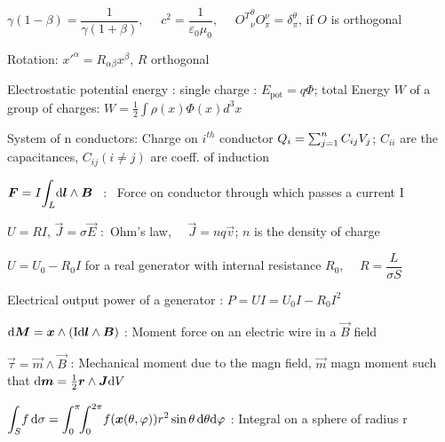 \squishend


\squishlist%
\item $\gamma(1-\beta) = \dfrac{1}{\gamma(1+\beta)}, \quad  \,\, c^2 = \dfrac{1}{\varepsilon_0\mu_0}, \quad \,\, {O^T}^{\theta}_{\nu} O^{\nu}_{\pi} = \delta^{\theta}_{\pi}$, if $O$ is orthogonal
\item Rotation: $x'^\alpha=R_{\alpha \beta}x^\beta$, $R$ orthogonal

\item Electrostatic potential energy : single charge : $E_{\text{pot}} = q\Phi$; total Energy $W$ of a group of charges: $W=\frac{1}{2}\int\rho(x)\Phi(x)d^3x$

\item System of n conductors: Charge on $i^{th}$ conductor $Q_i=\sum_{\substack j=1}^nC_{ij}V_j$; $C_{ii}$ are the capacitances, $C_{ij} (i\neq j)$ are coeff. of induction 
 
\item $\mbox{\boldmath$F$} = I \displaystyle{\int_L} \mbox{\boldmath$\textrm{d} l$} \wedge \mbox{\boldmath$B$}$ \, : \, Force on conductor through which passes a current I

\item $U = R I$, $\vec{J} = \sigma\vec{E}$ :\, Ohm's law, $\quad \vec{J} = nq\vec{v}$; $n$ is the density of charge%

\item $U = U_0 - R_0I$ for a real generator with internal resistance $R_0$, $\quad R = \dfrac{L}{\sigma S}$ 

\item Electrical output power of a generator : $P = UI = U_0I - R_0I^2$ %

\item$\mbox{\boldmath$\textrm{d} M$} = \mbox{\boldmath$x$} \wedge (\rm{I}\mbox{\boldmath$\textrm{d} l$} \wedge \mbox{\boldmath$B$})$ : Moment force  on an electric wire in a $\vec{B}$ field

\item$\vec{\tau}=\vec{m} \wedge \vec{B}$ : Mechanical moment due to the magn field, $\vec{m}$ magn moment such that $\mbox{\boldmath$\textrm{d} m$}=\frac{1}{2}\mbox{\boldmath$r$} \wedge \mbox{\boldmath$J$} \textrm{d} V$

\item$\displaystyle{\int_{S}} f \, \textrm{d} \sigma = \displaystyle{\int_0^{\pi}} \! \displaystyle{\int_0^{2\pi}} f(\mbox{\boldmath$x$}(\theta, \varphi)) r^2\sin\theta \, \textrm{d} \theta\textrm{d} \varphi$ : Integral on a sphere of radius r

